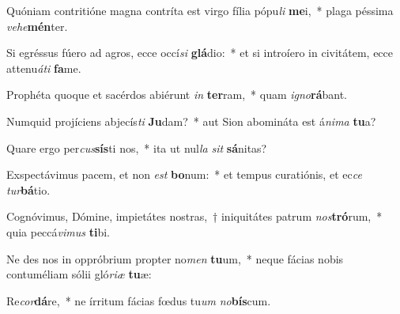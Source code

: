 \item Quóniam contritióne magna contríta est virgo fília pópu\textit{li} \textbf{me}i,~* plaga péssima \textit{ve}\textit{he}\textbf{mén}ter.
\item Si egréssus fúero ad agros, ecce occí\textit{si} \textbf{glá}dio:~* et si introíero in civitátem, ecce attenu\textit{á}\textit{ti} \textbf{fa}me.
\item Prophéta quoque et sacérdos abiérunt \textit{in} \textbf{ter}ram,~* quam \textit{i}\textit{gno}\textbf{rá}bant.
\item Numquid projíciens abjecís\textit{ti} \textbf{Ju}dam?~* aut Sion abomináta est á\textit{ni}\textit{ma} \textbf{tu}a?
\item Quare ergo per\textit{cus}\textbf{sís}ti nos,~* ita ut nul\textit{la} \textit{sit} \textbf{sá}nitas?
\item Exspectávimus pacem, et non \textit{est} \textbf{bo}num:~* et tempus curatiónis, et ec\textit{ce} \textit{tur}\textbf{bá}tio.
\item Cognóvimus, Dómine, impietátes nostras,~† iniquitátes patrum \textit{nos}\textbf{tró}rum,~* quia peccá\textit{vi}\textit{mus} \textbf{ti}bi.
\item Ne des nos in oppróbrium propter no\textit{men} \textbf{tu}um,~* neque fácias nobis contuméliam sólii gló\textit{ri}\textit{æ} \textbf{tu}æ:
\item Re\textit{cor}\textbf{dá}re,~* ne írritum fácias fœdus tu\textit{um} \textit{no}\textbf{bís}cum.

